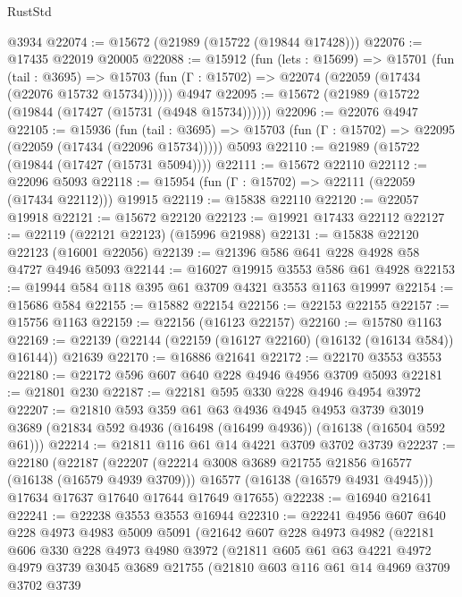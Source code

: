 \begin{lexlean}{RustStd}
\begin{coremodule}
    @3934
@22074 := @15672 (@21989 (@15722 (@19844 @17428)))
@22076 := @17435 @22019 @20005
@22088 := @15912
    (fun (lets : @15699) =>
    @15701
      (fun (tail : @3695) =>
      @15703 (fun (Γ : @15702) => @22074 (@22059 (@17434 (@22076 @15732 @15734))))))
    @4947
@22095 := @15672 (@21989 (@15722 (@19844 (@17427 (@15731 (@4948 @15734))))))
@22096 := @22076 @4947
@22105 := @15936
    (fun (tail : @3695) => @15703 (fun (Γ : @15702) => @22095 (@22059 (@17434 (@22096 @15734)))))
    @5093
@22110 := @21989 (@15722 (@19844 (@17427 (@15731 @5094))))
@22111 := @15672 @22110
@22112 := @22096 @5093
@22118 := @15954 (fun (Γ : @15702) => @22111 (@22059 (@17434 @22112))) @19915
@22119 := @15838 @22110
@22120 := @22057 @19918
@22121 := @15672 @22120
@22123 := @19921 @17433 @22112
@22127 := @22119 (@22121 @22123) (@15996 @21988)
@22131 := @15838 @22120 @22123 (@16001 @22056)
@22139 := @21396 @586 @641 @228 @4928 @58 @4727 @4946 @5093
@22144 := @16027 @19915 @3553 @586 @61 @4928
@22153 := @19944 @584 @118 @395 @61 @3709 @4321 @3553 @1163 @19997
@22154 := @15686 @584
@22155 := @15882 @22154
@22156 := @22153 @22155
@22157 := @15756 @1163
@22159 := @22156 (@16123 @22157)
@22160 := @15780 @1163
@22169 := @22139 (@22144 (@22159 (@16127 @22160) (@16132 (@16134 @584)) @16144)) @21639
@22170 := @16886 @21641
@22172 := @22170 @3553 @3553
@22180 := @22172 @596 @607 @640 @228 @4946 @4956 @3709 @5093
@22181 := @21801 @230
@22187 := @22181 @595 @330 @228 @4946 @4954 @3972
@22207 := @21810
    @593
    @359
    @61
    @63
    @4936
    @4945
    @4953
    @3739
    @3019
    @3689
    (@21834 @592 @4936 (@16498 (@16499 @4936)) (@16138 (@16504 @592 @61)))
@22214 := @21811 @116 @61 @14 @4221 @3709 @3702 @3739
@22237 := @22180
    (@22187
      (@22207
        (@22214 @3008 @3689 @21755 @21856 @16577 (@16138 (@16579 @4939 @3709)))
        @16577
        (@16138 (@16579 @4931 @4945)))
      @17634
      @17637
      @17640
      @17644
      @17649
      @17655)
@22238 := @16940 @21641
@22241 := @22238 @3553 @3553 @16944
@22310 := @22241
    @4956
    @607
    @640
    @228
    @4973
    @4983
    @5009
    @5091
    (@21642
      @607
      @228
      @4973
      @4982
      (@22181
        @606
        @330
        @228
        @4973
        @4980
        @3972
        (@21811
          @605
          @61
          @63
          @4221
          @4972
          @4979
          @3739
          @3045
          @3689
          @21755
          (@21810
            @603
            @116
            @61
            @14
            @4969
            @3709
            @3702
            @3739

\end{coremodule}
\end{lexlean}
